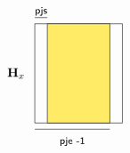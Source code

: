 \documentclass[10pt]{article}
\begin{document}
\[\begin{tikzpicture}
%
\node[draw=black,minimum width=7em,minimum height=8em,rectangle]  at (0,0) {};
\node[draw=black,fill=nyellow!60,minimum width=5em,minimum height=8em,rectangle]  at (0,0) {};
%
\node[]  at (-5em,0) {${\bf H}_x$};
%
\draw[] (-3.5em,4.5em) -- (-2.5em,4.5em);
\draw[] (-3.5em,-4.5em) -- (2.5em,-4.5em);
%
\node[]  at (-0.5em,-5.5em) {\footnotesize{{\sf pje -1}}};
\node[]  at (-3em,5em) {\footnotesize{{\sf pjs}}};
\end{tikzpicture}
\]
\end{document}

